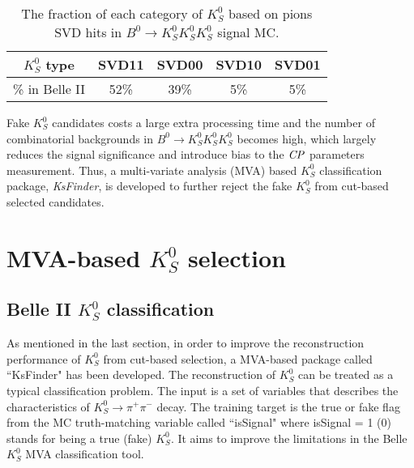 \begin{table}[H]
	\centering
	\begin{tabular}{|c|c|c|c|c|}
		\hline
		$K_S^0$ type & SVD11 & SVD00 & SVD10 & SVD01\\
		\hline
		\% in Belle II & 52\% & 39\% & 5\% & 5\%\\
		\hline
	\end{tabular}
	\caption{The fraction of each category of $K_S^0$ based on pions SVD hits in $B^0 \to K_S^0  K_S^0  K_S^0$ signal MC.}
	\label{tab:svdxx}
\end{table}
\begin{comment}
\begin{figure}[htpb]
\centering
\texttt{[image: VXDGEO.png]}
\caption{Geometric structure of PXD and SVD in Belle II\cite{Abe:2010gxa}. SVD Layer 5 is at $r = 11$ cm and $K_S^0$ that decay outside are very likely to lose SVD hits information.}
\label{fig:vxdgeo}
\end{figure}
\end{comment}


Fake $K_S^0$ candidates costs a large extra processing time and the number of combinatorial backgrounds in $B^0 \to K_S^0  K_S^0  K_S^0$ becomes high, which largely reduces the signal significance and introduce bias to the $\it{CP}$ parameters measurement. Thus, a multi-variate analysis (MVA) based $K_S^0$ classification package, \textit{KsFinder}, is developed to further reject the fake $K_S^0$ from cut-based selected candidates.


\section{MVA-based $K_S^0$ selection}

\subsection{Belle II $K_S^0$ classification}
As mentioned in the last section, in order to improve the reconstruction performance of $K_S^0$ from cut-based selection, a MVA-based package called ``KsFinder" has been developed. The reconstruction of $K_S^0$ can be treated as a typical classification problem. The input is a set of variables that describes the characteristics of $K_S^0 \to \pi^+ \pi^-$ decay. The training  target is the true or fake flag from the MC truth-matching variable called ``isSignal" where isSignal = 1 (0) stands for being a true (fake) $K_S^0$. It aims to improve the limitations in the Belle $K_S^0$ MVA classification tool. 
 
